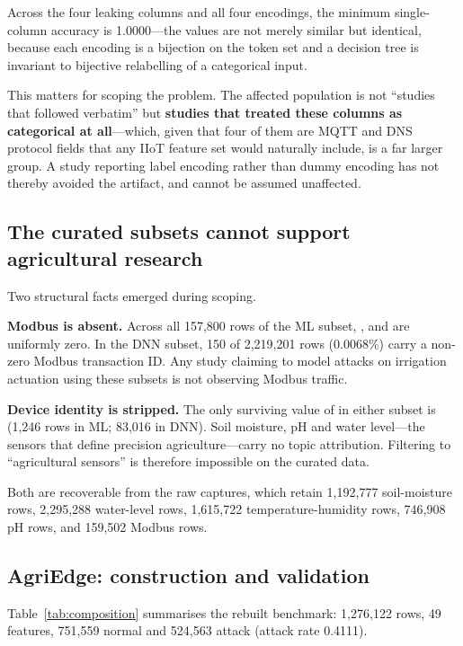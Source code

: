 Across the four leaking columns and all four encodings, the minimum
single-column accuracy is 1.0000---the values are not merely similar but
identical, because each encoding is a bijection on the token set and a decision
tree is invariant to bijective relabelling of a categorical input.

This matters for scoping the problem. The affected population is not ``studies
that followed  verbatim'' but \textbf{studies that treated
these columns as categorical at all}---which, given that four of them are MQTT
and DNS protocol fields that any IIoT feature set would naturally include, is a
far larger group. A study reporting label encoding rather than dummy encoding
has not thereby avoided the artifact, and cannot be assumed unaffected.

\subsection{The curated subsets cannot support agricultural research}
\label{sec:cannot}

Two structural facts emerged during scoping.

\textbf{Modbus is absent.} Across all 157{,}800 rows of the ML subset,
,  and  are
uniformly zero. In the DNN subset, 150 of 2{,}219{,}201 rows (0.0068\%) carry a
non-zero Modbus transaction ID. Any study claiming to model attacks on
irrigation actuation using these subsets is not observing Modbus traffic.

\textbf{Device identity is stripped.} The only surviving value of
 in either subset is 
(1{,}246 rows in ML; 83{,}016 in DNN). Soil moisture, pH and water level---the
sensors that define precision agriculture---carry no topic attribution.
Filtering to ``agricultural sensors'' is therefore impossible on the curated
data.

Both are recoverable from the raw captures, which retain 1{,}192{,}777
soil-moisture rows, 2{,}295{,}288 water-level rows, 1{,}615{,}722
temperature-humidity rows, 746{,}908 pH rows, and 159{,}502 Modbus rows.

\subsection{AgriEdge: construction and validation}
\label{sec:agriedge}

Table~\ref{tab:composition} summarises the rebuilt benchmark: 1{,}276{,}122
rows, 49 features, 751{,}559 normal and 524{,}563 attack (attack rate 0.4111).

